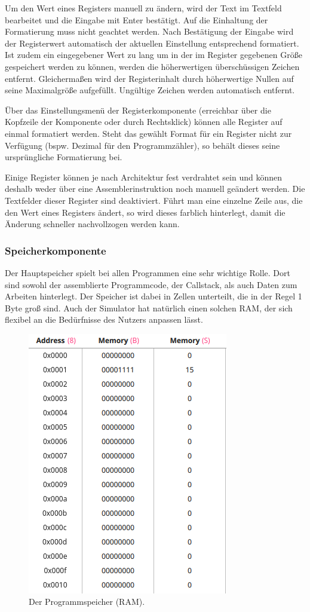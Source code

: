 Um den Wert eines Registers manuell zu ändern, wird der Text im Textfeld
bearbeitet und die Eingabe mit Enter bestätigt. Auf die Einhaltung der
Formatierung muss nicht geachtet werden. Nach Bestätigung der Eingabe wird der
Registerwert automatisch der aktuellen Einstellung entsprechend formatiert. Ist
zudem ein eingegebener Wert zu lang um in der im Register gegebenen Größe gespeichert
werden zu können, werden die höherwertigen überschüssigen Zeichen entfernt.
Gleichermaßen wird der Registerinhalt durch höherwertige Nullen auf seine
Maximalgröße aufgefüllt. Ungültige Zeichen werden automatisch entfernt.

Über das Einstellungsmenü der Registerkomponente (erreichbar über die Kopfzeile
der Komponente oder durch Rechtsklick) können alle Register auf einmal
formatiert werden. Steht das gewählt Format für ein Register nicht zur Verfügung
(bspw. Dezimal für den Programmzähler), so behält dieses seine ursprüngliche
Formatierung bei.

Einige Register können je nach Architektur fest verdrahtet sein und können
deshalb weder über eine Assemblerinstruktion noch manuell geändert werden. Die
Textfelder dieser Register sind deaktiviert. Führt man eine einzelne Zeile aus,
die den Wert eines Registers ändert, so wird dieses farblich hinterlegt, damit
die Änderung schneller nachvollzogen werden kann.

\subsubsection{Speicherkomponente}
Der Hauptspeicher spielt bei allen Programmen eine sehr wichtige Rolle. Dort
sind sowohl der assemblierte Programmcode, der Callstack, als auch Daten zum
Arbeiten hinterlegt. Der Speicher ist dabei in Zellen unterteilt, die in der
Regel 1 Byte groß sind. Auch der Simulator hat natürlich einen solchen RAM, der
sich flexibel an die Bedürfnisse des Nutzers anpassen lässt.

\begin{figure}[ht]
	\centering
  \includegraphics[scale=1]{Images/Memory}
	\caption{Der Programmspeicher (RAM).}
	\label{Memory}
\end{figure}


